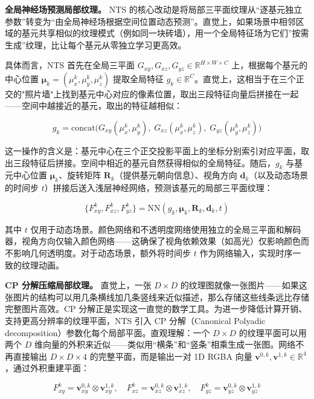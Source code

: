 \smallskip
\noindent\textbf{全局神经场预测局部纹理。}
NTS 的核心改动是将局部三平面纹理从“逐基元独立参数”转变为“由全局神经场根据空间位置动态预测”。直觉上，如果场景中相邻区域的基元共享相似的纹理模式（例如同一块砖墙），用一个全局特征场为它们”按需生成”纹理，比让每个基元从零独立学习更高效。

具体而言，NTS 首先在全局三平面 $G_{xy}, G_{xz}, G_{yz} \in \mathbb{R}^{H \times W \times C}$ 上，根据每个基元的中心位置 $\boldsymbol{\mu}_k = (\mu_x^k, \mu_y^k, \mu_z^k)$ 提取全局特征 $g_k \in \mathbb{R}^C$。直觉上，这相当于在三个正交的"照片墙"上找到基元中心对应的像素位置，取出三段特征向量后拼接在一起——空间中越接近的基元，取出的特征越相似：

\begin{equation}
g_k = \text{concat}\big(G_{xy}(\mu_x^k, \mu_y^k),\; G_{xz}(\mu_x^k, \mu_z^k),\; G_{yz}(\mu_y^k, \mu_z^k)\big)
\end{equation}

这一操作的含义是：基元中心在三个正交投影平面上的坐标分别索引对应平面，取出三段特征后拼接。空间中相近的基元自然获得相似的全局特征。随后，$g_k$ 与基元中心位置 $\boldsymbol{\mu}_k$、旋转矩阵 $\mathbf{R}_k$（提供基元朝向信息）、视角方向 $\mathbf{d}_k$（以及动态场景的时间步 $t$）拼接后送入浅层神经网络，预测该基元的局部三平面纹理：

\begin{equation}
\{F_{xy}^k, F_{xz}^k, F_{yz}^k\} = \text{NN}(g_k, \boldsymbol{\mu}_k, \mathbf{R}_k, \mathbf{d}_k, t)
\end{equation}

其中 $t$ 仅用于动态场景。颜色网络和不透明度网络使用独立的全局三平面和解码器，视角方向仅输入颜色网络——这确保了视角依赖效果（如高光）仅影响颜色而不影响几何透明度。对于动态场景，额外将时间步 $t$ 作为网络输入，实现时序一致的纹理动画。

\smallskip
\noindent\textbf{CP 分解压缩局部纹理。}
直觉上，一张 $D \times D$ 的纹理图就像一张图片——如果这张图片的结构可以用几条横线加几条竖线来近似描述，那么存储这些线条远比存储完整图片高效。CP 分解正是实现这一直觉的数学工具。为进一步降低计算开销、支持更高分辨率的纹理平面，NTS 引入 CP 分解（Canonical Polyadic decomposition）参数化每个局部平面。直观理解：一个 $D \times D$ 的纹理平面可以用两个 $D$ 维向量的外积来近似——类似用“横条”和“竖条”相乘生成一张图。网络不再直接输出 $D \times D \times 4$ 的完整平面，而是输出一对 1D RGBA 向量 $\mathbf{v}^{0,k}, \mathbf{v}^{1,k} \in \mathbb{R}^4$，通过外积重建平面：

\begin{equation}
F_{xy}^k = \mathbf{v}^{0,k}_{xy} \otimes \mathbf{v}^{1,k}_{xy}, \quad F_{xz}^k = \mathbf{v}^{0,k}_{xz} \otimes \mathbf{v}^{1,k}_{xz}, \quad F_{yz}^k = \mathbf{v}^{0,k}_{yz} \otimes \mathbf{v}^{1,k}_{yz}
\end{equation}

